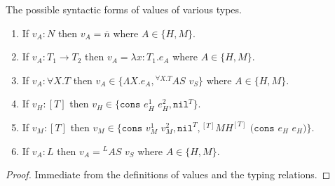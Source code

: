 \begin{lemma}
\label{cf}
The possible syntactic forms of values of various types.
\begin{enumerate}
\item If $v_{A}:N$ then $v_{A}=\overline{n}$ where $A\in\lbrace H,M\rbrace$.
\item If $v_{A}:T_{1}\rightarrow T_{2}$ then $v_{A}=\lambda x:T_{1}.e_{A}$ where $A\in\lbrace H,M\rbrace$.
\item If $v_{A}:\forall X.T$ then $v_{A}\in\lbrace\Lambda X.e_{A},{^{\forall X.T}A}S$ $v_{S}\rbrace$ where $A\in\lbrace H,M\rbrace$.
\item If $v_{H}:[T]$ then $v_{H}\in\lbrace\mathtt{cons}$ $e_{H}^{1}$ $e_{H}^{2},\mathtt{nil}^{T}\rbrace$.
\item If $v_{M}:[T]$ then $v_{M}\in\lbrace\mathtt{cons}$ $v_{M}^{1}$ $v_{M}^{2},\mathtt{nil}^{T},{^{[T]}M}H^{[T]}$ $(\mathtt{cons}$ $e_{H}$ $e_{H})\rbrace$.
\item If $v_{A}:L$ then $v_{A}={^{L}A}S$ $v_{S}$ where $A\in\lbrace H,M\rbrace$.
\end{enumerate}
\begin{proof}
Immediate from the definitions of values and the typing relations.
\end{proof}
\end{lemma}